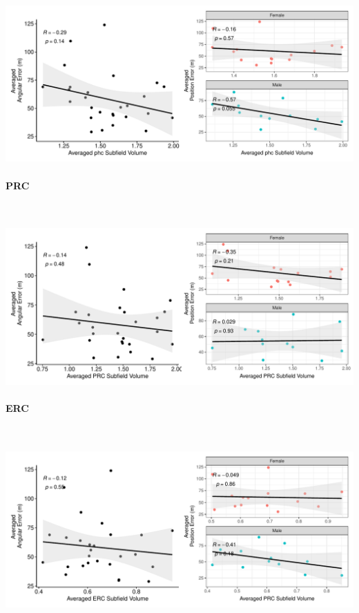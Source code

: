 \documentclass[
]{article}
\begin{document}
\includegraphics{hippocampal_subfield_files/figure-latex/unnamed-chunk-4-1.pdf}

\paragraph{PRC}

~ \vspace{1cm}

\includegraphics{hippocampal_subfield_files/figure-latex/unnamed-chunk-5-1.pdf}

\newpage
\paragraph{ERC}

~ \vspace{1cm}

\includegraphics{hippocampal_subfield_files/figure-latex/unnamed-chunk-6-1.pdf}
\end{document}
